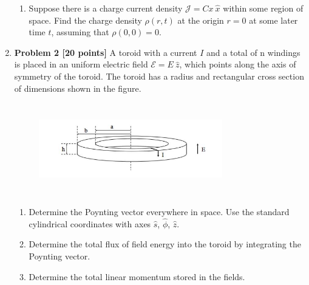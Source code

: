 \documentclass[fleqn]{article}
\begin{document}
\begin{enumerate}
\begin{enumerate}
      \item Suppose there is a charge current density $\mathcal{J}=Cx ~ \hat{x}$ within some region of space. Find the
      charge density $\rho(r, t)$ at the origin $r=0$ at some later time $t$, assuming that $\rho(0, 0)=0$.

      
    \end{enumerate}


    \item \textbf{Problem 2 [20 points]} A toroid with a current $I$ and a total of n windings is placed in an uniform
    electric field $\mathcal{E}=E ~ \hat{z}$, which points along the axis of symmetry of the toroid. The toroid has a radius
    and rectangular cross section of dimensions shown in the figure.

      \begin{figure}[h!]
        \centering
        \includegraphics[height=4cm, width=8cm]{One.JPG}
      \end{figure}

      \begin{enumerate}
        \item Determine the Poynting vector everywhere in space. Use the standard cylindrical coordinates
        with axes $\hat{s}$, $\hat{\phi}$, $\hat{z}$.


        \item Determine the total flux of field energy into the toroid by integrating the Poynting vector.


        \item Determine the total linear momentum stored in the fields.



\end{enumerate}
\end{enumerate}
\end{document}
